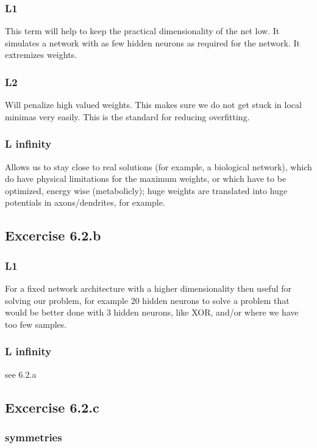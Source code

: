 \documentclass[a4paper,headings=small]{scrartcl}
\numberwithin{equation}{section} %
\numberwithin{figure}{section}   %
\begin{document}
\subsubsection{L1}
This term will help to keep the practical dimensionality of the net low.
It simulates a network with as few hidden neurons as required for the network.
It extremizes weights.

\subsubsection{L2}
Will penalize high valued weights.
This makes sure we do not get stuck in local minimas very easily.
This is the standard for reducing overfitting.

\subsubsection{L infinity}
Allows us to stay close to real solutions (for example, a biological network),
which do have physical limitations for the maximum weights,
or which have to be optimized, energy wise (metabolicly);
huge weights are translated into huge potentials in axons/dendrites, for example.

\subsection{Excercise 6.2.b}

\subsubsection{L1}
For a fixed network architecture with a higher dimensionality then useful for solving our problem,
for example 20 hidden neurons to solve a problem that would be better done with 3 hidden neurons,
like XOR, and/or where we have too few samples.

\subsubsection{L infinity}
see 6.2.a


\subsection{Excercise 6.2.c}

\subsubsection{symmetries}
\end{document}
